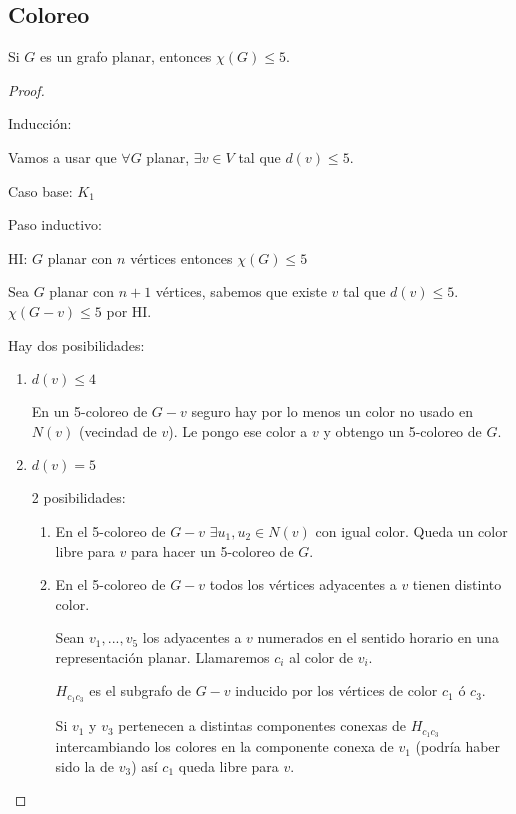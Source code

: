 \subsection{Coloreo}

\begin{teo}[Headwood, 1890]
    Si $G$ es un grafo planar, entonces $\chi(G) \leq 5$.
\end{teo}

\begin{proof}
    ~

    Inducción:

    Vamos a usar que $\forall G$ planar, $\exists v \in V $ tal que $d(v) \leq 5$.

    Caso base: $K_1$

    Paso inductivo:

    HI: $G$ planar con $n$ vértices entonces $\chi(G) \leq 5$

    Sea $G$ planar con $n + 1$ vértices, sabemos que existe $v$ tal que $d(v) \leq 5$. $\chi(G - v) \leq 5$ por HI.

    Hay dos posibilidades:
    \begin{enumerate}
        \item $d(v) \leq 4$

        En un 5-coloreo de $G - v$ seguro hay por lo menos un color no usado en $N(v)$ (vecindad de $v$). Le pongo ese color a $v$ y obtengo un 5-coloreo de $G$.

        \item $d(v) = 5$

        2 posibilidades:

        \begin{enumerate}
        \item En el 5-coloreo de $G - v$ $\exists u_1, u_2 \in N(v)$ con igual color. Queda un color libre para $v$ para hacer un 5-coloreo de $G$.

        \item En el 5-coloreo de $G - v$ todos los vértices adyacentes a $v$ tienen distinto color. 

        Sean $v_1, ..., v_5$ los adyacentes a $v$ numerados en el sentido horario en una representación planar. Llamaremos $c_i$ al color de $v_i$.

        $H_{c_1 c_3}$ es el subgrafo de $G - v$ inducido por los vértices de color $c_1$ ó $c_3$. 

        Si $v_1$ y $v_3$ pertenecen a distintas componentes conexas de $H_{c_1 c_3}$ intercambiando los colores en la componente conexa de $v_1$ (podría haber sido la de $v_3$) así $c_1$ queda libre para $v$.


\end{enumerate}
\end{enumerate}
\end{proof}
